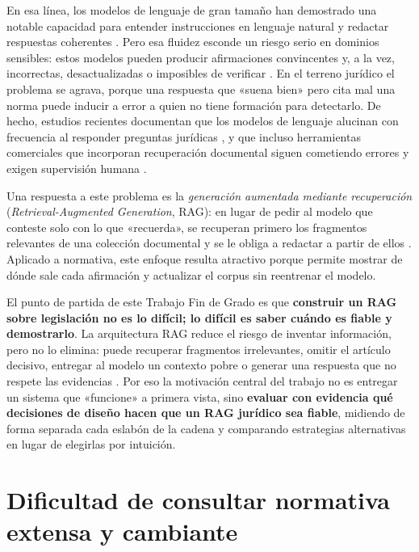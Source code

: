 En esa línea, los modelos de lenguaje de gran tamaño han demostrado una notable capacidad para entender instrucciones en lenguaje natural y redactar respuestas coherentes \cite{brown2020language}. Pero esa fluidez esconde un riesgo serio en dominios sensibles: estos modelos pueden producir afirmaciones convincentes y, a la vez, incorrectas, desactualizadas o imposibles de verificar \cite{bender2021stochastic}. En el terreno jurídico el problema se agrava, porque una respuesta que «suena bien» pero cita mal una norma puede inducir a error a quien no tiene formación para detectarlo. De hecho, estudios recientes documentan que los modelos de lenguaje alucinan con frecuencia al responder preguntas jurídicas \cite{dahl2024legalhallucinations}, y que incluso herramientas comerciales que incorporan recuperación documental siguen cometiendo errores y exigen supervisión humana \cite{magesh2025hallucinationfree}.
 
Una respuesta a este problema es la \emph{generación aumentada mediante recuperación} (\emph{Retrieval-Augmented Generation}, RAG): en lugar de pedir al modelo que conteste solo con lo que «recuerda», se recuperan primero los fragmentos relevantes de una colección documental y se le obliga a redactar a partir de ellos \cite{lewis2020rag}. Aplicado a normativa, este enfoque resulta atractivo porque permite mostrar de dónde sale cada afirmación y actualizar el corpus sin reentrenar el modelo.
 
El punto de partida de este Trabajo Fin de Grado es que \textbf{construir un RAG sobre legislación no es lo difícil; lo difícil es saber cuándo es fiable y demostrarlo}. La arquitectura RAG reduce el riesgo de inventar información, pero no lo elimina: puede recuperar fragmentos irrelevantes, omitir el artículo decisivo, entregar al modelo un contexto pobre o generar una respuesta que no respete las evidencias \cite{kim2025legalragfail}. Por eso la motivación central del trabajo no es entregar un sistema que «funcione» a primera vista, sino \textbf{evaluar con evidencia qué decisiones de diseño hacen que un RAG jurídico sea fiable}, midiendo de forma separada cada eslabón de la cadena y comparando estrategias alternativas en lugar de elegirlas por intuición.
 
\section{Dificultad de consultar normativa extensa y cambiante}

\label{sec:dificultad-consulta-normativa}
 
